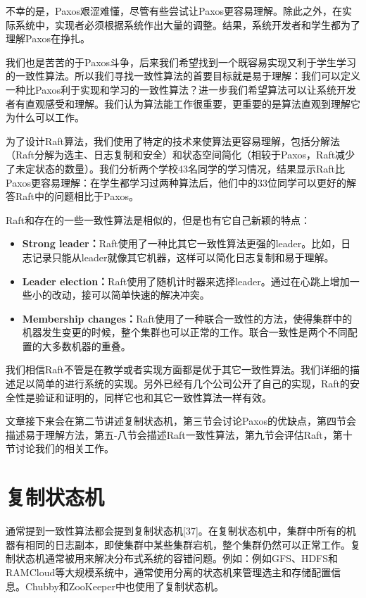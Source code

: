 \documentclass[journal]{IEEEtran}
\begin{document}
不幸的是，Paxos艰涩难懂，尽管有些尝试让Paxos更容易理解。除此之外，在实际系统中，实现者必须根据系统作出大量的调整。结果，系统开发者和学生都为了理解Paxos在挣扎。


我们也是苦苦的于Paxos斗争，后来我们希望找到一个既容易实现又利于学生学习的一致性算法。所以我们寻找一致性算法的首要目标就是易于理解：我们可以定义一种比Paxos利于实现和学习的一致性算法？进一步我们希望算法可以让系统开发者有直观感受和理解。我们认为算法能工作很重要，更重要的是算法直观到理解它为什么可以工作。


为了设计Raft算法，我们使用了特定的技术来使算法更容易理解，包括分解法（Raft分解为选主、日志复制和安全）和状态空间简化（相较于Paxos，Raft减少了未定状态的数量）。我们分析两个学校43名同学的学习情况，结果显示Raft比Paxos更容易理解：在学生都学习过两种算法后，他们中的33位同学可以更好的解答Raft中的问题相比于Paxos。


Raft和存在的一些一致性算法是相似的，但是也有它自己新颖的特点：
\begin{itemize}
\item \textbf{Strong leader：}Raft使用了一种比其它一致性算法更强的leader。比如，日志记录只能从leader就像其它机器，这样可以简化日志复制和易于理解。
\item \textbf{Leader election：}Raft使用了随机计时器来选择leader。通过在心跳上增加一些小的改动，接可以简单快速的解决冲突。
\item \textbf{Membership changes：}Raft使用了一种联合一致性的方法，使得集群中的机器发生变更的时候，整个集群也可以正常的工作。联合一致性是两个不同配置的大多数机器的重叠。
\end{itemize}


我们相信Raft不管是在教学或者实现方面都是优于其它一致性算法。我们详细的描述足以简单的进行系统的实现。另外已经有几个公司公开了自己的实现，Raft的安全性是验证和证明的，同样它也和其它一致性算法一样有效。


文章接下来会在第二节讲述复制状态机，第三节会讨论Paxos的优缺点，第四节会描述易于理解方法，第五-八节会描述Raft一致性算法，第九节会评估Raft，第十节讨论我们的相关工作。

\section{复制状态机}
通常提到一致性算法都会提到复制状态机[37]。在复制状态机中，集群中所有的机器有相同的日志副本，即使集群中某些集群宕机，整个集群仍然可以正常工作。复制状态机通常被用来解决分布式系统的容错问题。例如：例如GFS、HDFS和RAMCloud等大规模系统中，通常使用分离的状态机来管理选主和存储配置信息。Chubby和ZooKeeper中也使用了复制状态机。
\end{document}
